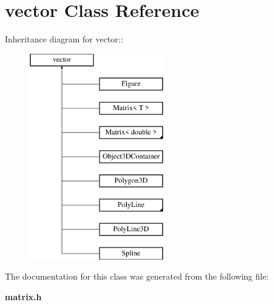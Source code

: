 \section{vector Class Reference}
\label{classstd_1_1vector}
Inheritance diagram for vector::\begin{figure}[H]
\begin{center}
\leavevmode
\includegraphics[height=9cm]{classstd_1_1vector}
\end{center}
\end{figure}


The documentation for this class was generated from the following file:\begin{CompactItemize}
\item 
{\bf matrix.h}\end{CompactItemize}

